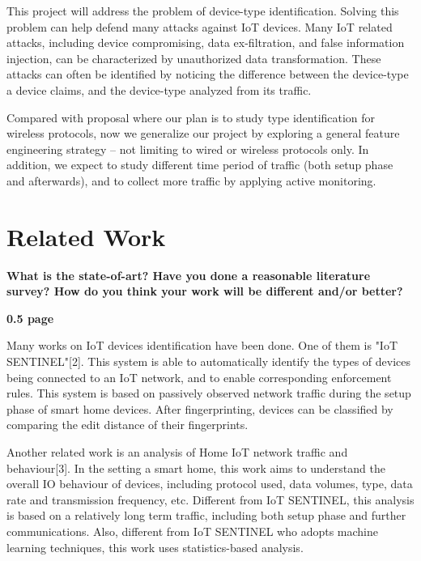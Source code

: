 \documentclass[twocolumn,10pt]{article}
\begin{document}
This project will address the problem of device-type
identification. Solving this problem can help defend many attacks against IoT devices. Many IoT related attacks, including device compromising, data ex-filtration, and false information injection, can be characterized by unauthorized data transformation. These attacks can often be identified by noticing the difference between the device-type a device claims, and the device-type analyzed from its traffic.

Compared with proposal where our plan is to study type identification for wireless protocols, now we generalize our project by exploring a general feature engineering strategy -- not limiting to wired or wireless protocols only. In addition, we expect to study different time period of traffic (both setup phase and afterwards), and to collect more traffic by applying active monitoring.

\section{Related Work}
{\bf What is the state-of-art? Have you done a reasonable literature survey? How do you think 
your work will be different and/or better?}

{\bf 0.5 page}

Many works on IoT devices identification have been done. One of them is "IoT SENTINEL"[2]. This system is able to automatically identify the types of devices being connected to an IoT network, and to enable corresponding enforcement rules. This system is based on passively observed network traffic during the setup phase of smart home devices. After fingerprinting, devices can be classified by comparing the edit distance of their fingerprints.

Another related work is an analysis of Home IoT network traffic and behaviour[3]. In the setting a smart home, this work aims to understand the overall IO behaviour of devices, including protocol used, data volumes, type, data rate and transmission frequency, etc. Different from IoT SENTINEL, this analysis is based on a relatively long term traffic, including both setup phase and further communications. Also, different from IoT SENTINEL who adopts machine learning techniques, this work uses statistics-based analysis.
\end{document}
